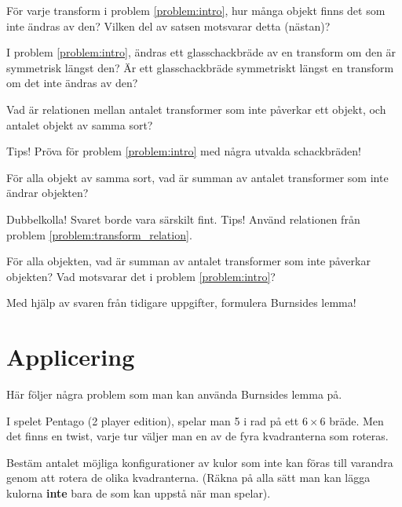 \begin{problem}
	För varje transform i problem \ref{problem:intro}, hur många objekt finns det som inte ändras av den? Vilken del av satsen motsvarar detta (nästan)?
\end{problem}

\begin{problem}
	I problem \ref{problem:intro}, ändras ett glasschackbräde av en transform om den är symmetrisk längst den? Är ett glasschackbräde symmetriskt längst en transform om det inte ändras av den?
\end{problem}

\begin{problem} \label{problem:transform_relation} 
	Vad är relationen mellan antalet transformer som inte påverkar ett objekt, och antalet objekt av samma sort?

	Tips! Pröva för problem \ref{problem:intro} med några utvalda schackbräden!
\end{problem}

\begin{problem}
	För alla objekt av samma sort, vad är summan av antalet transformer som inte ändrar objekten?

	Dubbelkolla! Svaret borde vara särskilt fint. Tips! Använd relationen från problem \ref{problem:transform_relation}.
\end{problem}

\begin{problem}
	För alla objekten, vad är summan av antalet transformer som inte påverkar objekten? Vad motsvarar det i problem \ref{problem:intro}?
\end{problem}

\begin{problem}
	Med hjälp av svaren från tidigare uppgifter, formulera Burnsides lemma!
\end{problem}

\newpage
\section{Applicering}
Här följer några problem som man kan använda Burnsides lemma på.

\begin{problem}
	I spelet Pentago (2 player edition), spelar man 5 i rad på ett \(6 \times 6\) bräde. Men det finns en twist, varje tur väljer man en av de fyra kvadranterna som roteras.

	Bestäm antalet möjliga konfigurationer av kulor som inte kan föras till varandra genom att rotera de olika kvadranterna. (Räkna på alla sätt man kan lägga kulorna \textbf{inte} bara de som kan uppstå när man spelar).
\end{problem}

